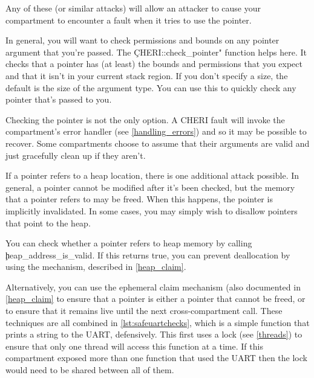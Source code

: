 Any of these (or similar attacks) will allow an attacker to cause your compartment to encounter a fault when it tries to use the pointer.

In general, you will want to check permissions and bounds on any pointer argument that you're passed.
The \c{CHERI::check_pointer"} function helps here.
It checks that a pointer has (at least) the bounds and permissions that you expect and that it isn't in your current stack region.
If you don't specify a size, the default is the size of the argument type.
You can use this to quickly check any pointer that's passed to you.


\begin{note}
Checking the pointer is not the only option.
A CHERI fault will invoke the compartment's error handler (see \ref{handling_errors}) and so it may be possible to recover.
Some compartments choose to assume that their arguments are valid and just gracefully clean up if they aren't.
\end{note}

If a pointer refers to a heap location, there is one additional attack possible.
In general, a pointer cannot be modified after it's been checked, but the memory that a pointer refers to may be freed.
When this happens, the pointer is implicitly invalidated.
In some cases, you may simply wish to disallow pointers that point to the heap.

You can check whether a pointer refers to heap memory by calling \c{heap_address_is_valid}.
If this returns true, you can prevent deallocation by using the  mechanism, described in \ref{heap_claim}.


Alternatively, you can use the ephemeral claim mechanism (also documented in \ref{heap_claim} to ensure that a pointer is either a pointer that cannot be freed, or to ensure that it remains live until the next cross-compartment call.
These techniques are all combined in \ref{lst:safeuartchecks}, which is a simple function that prints a string to the UART, defensively.
This first uses a lock (see \ref{threads}) to ensure that only one thread will access this function at a time.
If this compartment exposed more than one function that used the UART then the lock would need to be shared between all of them.

